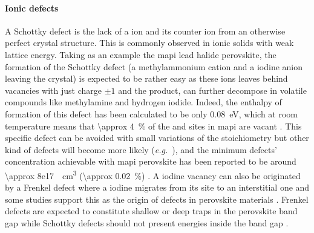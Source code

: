 	\paragraph{Ionic defects}
	A Schottky defect is the lack of a ion and its counter ion from an otherwise perfect crystal structure.
	This is commonly observed in ionic solids with weak lattice energy.
	Taking as an example the \gls{mapi} lead halide perovskite, the formation of the Schottky defect  (a methylammonium cation and a iodine anion leaving the crystal) is expected to be rather easy as these ions leaves behind vacancies with just charge $\pm 1$ and the product,  can further decompose in volatile compounds like methylamine and hydrogen iodide.
	Indeed, the enthalpy of formation of this defect has been calculated to be only \SI{0.08}{\eV}, which at room temperature means that \SI{\approx 4}{\%} of the  and  sites in \gls{mapi} are vacant \cite{Walsh2015,Yin2014}.
	This specific defect can be avoided with small variations of the stoichiometry but other kind of defects will become more likely (\textsl{e.g.}\ ), and the minimum defects' concentration achievable with \gls{mapi} perovskite has been reported to be around \SI{\approx 8e17}{\per\cubic\cm} (\SI{\approx 0.02}{\%}) \cite{Walsh2015}.
	A iodine vacancy can also be originated by a Frenkel defect where a iodine migrates from its site to an interstitial one  and some studies support this as the origin of defects in perovskite materials \cite{Birkhold2018,Birkhold2018a,Minns2017,Mosconi2016,Uratani2017}.
	Frenkel defects are expected to constitute shallow or deep traps in the perovskite band gap while Schottky defects should not present energies inside the band gap \cite{Kim2014h,Yin2014,Buin2014,Du2015}.

